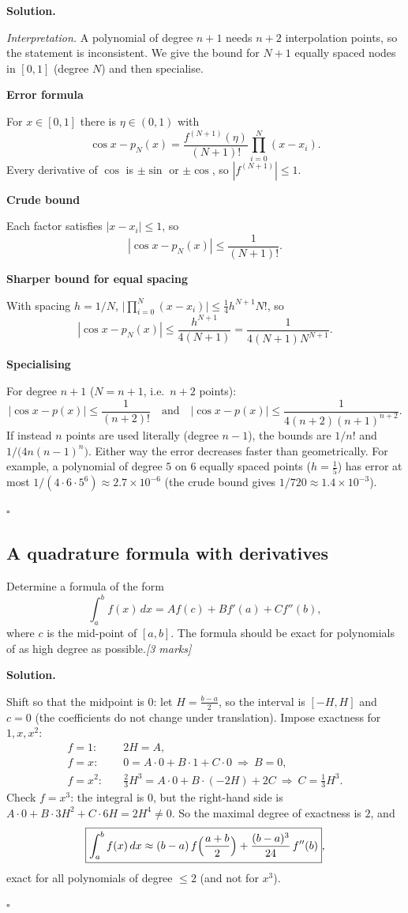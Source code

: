 \documentclass[11pt,a4paper]{article}
\newenvironment{solution}
  {\par\noindent\textbf{Solution.}\par\nobreak}
  {\par\hfill\(\square\)\par}
\newcommand{\step}[1]{\par\addvspace{0.5em}\noindent\textbf{#1}\par\nobreak}
\newcommand{\mk}[1]{\hfill\textit{[#1 marks]}}
\begin{document}
\begin{solution}
\textit{Interpretation.}  A polynomial of degree \(n+1\) needs \(n+2\)
interpolation points, so the statement is inconsistent.  We give the
bound for \(N+1\) equally spaced nodes in \([0,1]\) (degree \(N\)) and
then specialise.

\step{Error formula}
For \(x\in[0,1]\) there is \(\eta\in(0,1)\) with
\[
  \cos x-p_N(x)=\frac{f^{(N+1)}(\eta)}{(N+1)!}\prod_{i=0}^N(x-x_i).
\]
Every derivative of \(\cos\) is \(\pm\sin\) or \(\pm\cos\), so
\(|f^{(N+1)}|\le1\).

\step{Crude bound}
Each factor satisfies \(|x-x_i|\le1\), so
\[
  |\cos x-p_N(x)|\le\frac1{(N+1)!}.
\]

\step{Sharper bound for equal spacing}
With spacing \(h=1/N\), \(\bigl|\prod_{i=0}^N(x-x_i)\bigr|\le\frac14h^{N+1}N!\),
so
\[
  |\cos x-p_N(x)|\le\frac{h^{N+1}}{4(N+1)}=\frac1{4(N+1)N^{N+1}}.
\]

\step{Specialising}
For degree \(n+1\) (\(N=n+1\), i.e.\ \(n+2\) points):
\[
  |\cos x-p(x)|\le\frac1{(n+2)!}
  \quad\text{and}\quad
  |\cos x-p(x)|\le\frac1{4(n+2)(n+1)^{n+2}} .
\]
If instead \(n\) points are used literally (degree \(n-1\)), the bounds
are \(1/n!\) and \(1/\bigl(4n(n-1)^n\bigr)\).  Either way the error
decreases faster than geometrically.  For example, a polynomial of
degree \(5\) on \(6\) equally spaced points (\(h=\frac15\)) has error at
most \(1/(4\cdot6\cdot5^6)\approx2.7\times10^{-6}\) (the crude bound
gives \(1/720\approx1.4\times10^{-3}\)).
\end{solution}

\subsection{A quadrature formula with derivatives}

\begin{qbox}
Determine a formula of the form
\[
  \int_a^bf(x)\,dx=Af(c)+Bf'(a)+Cf''(b),
\]
where \(c\) is the mid-point of \([a,b]\).  The formula should be exact
for polynomials of as high degree as possible.\mk{3}
\end{qbox}

\begin{solution}
Shift so that the midpoint is \(0\): let \(H=\frac{b-a}2\), so the
interval is \([-H,H]\) and \(c=0\) (the coefficients do not change
under translation).  Impose exactness for \(1,x,x^2\):
\begin{align*}
  f=1:&\quad 2H=A,\\
  f=x:&\quad 0=A\cdot0+B\cdot1+C\cdot0\ \Rightarrow\ B=0,\\
  f=x^2:&\quad \tfrac23H^3=A\cdot0+B\cdot(-2H)+2C\ \Rightarrow\ C=\tfrac13H^3 .
\end{align*}
Check \(f=x^3\): the integral is \(0\), but the right-hand side is
\(A\cdot0+B\cdot3H^2+C\cdot6H=2H^4\ne0\).  So the maximal degree of
exactness is \(2\), and
\[
  \boxed{\int_a^bf(x)\,dx\approx(b-a)\,f\Bigl(\frac{a+b}2\Bigr)
  +\frac{(b-a)^3}{24}\,f''(b)},
\]
exact for all polynomials of degree \(\le2\) (and not for \(x^3\)).
\end{solution}
\end{document}
